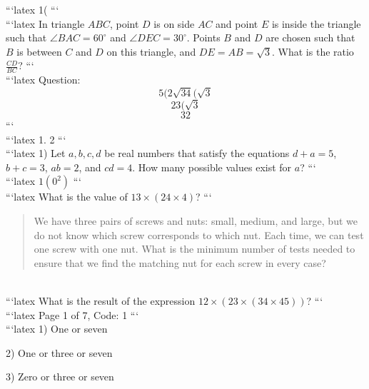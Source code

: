 ```latex
1(
```
\\
```latex
In triangle $ABC$, point $D$ is on side $AC$ and point $E$ is inside the triangle such that $\angle BAC = 60^\circ$ and $\angle DEC = 30^\circ$. Points $B$ and $D$ are chosen such that $B$ is between $C$ and $D$ on this triangle, and $DE = AB = \sqrt{3}$. What is the ratio $\frac{CD}{BC}$?
```
\\
```latex
Question:
\[ 5(2\sqrt{34}(\sqrt{3} \]
\[ 23(\sqrt{3} \]
\[ 32 \]
```
\\
```latex
1. 2
```
\\
```latex
1) Let \( a, b, c, d \) be real numbers that satisfy the equations \( d + a = 5 \), \( b + c = 3 \), \( ab = 2 \), and \( cd = 4 \). How many possible values exist for \( a \)?
```
\\
```latex
$1(0^2)$
```
\\
```latex
What is the value of $13 \times (24 \times 4)$?
```
\\
\begin{quote}
We have three pairs of screws and nuts: small, medium, and large, but we do not know which screw corresponds to which nut. Each time, we can test one screw with one nut. What is the minimum number of tests needed to ensure that we find the matching nut for each screw in every case?
\end{quote}
\\
```latex
What is the result of the expression $12 \times (23 \times (34 \times 45))$?
```
\\
```latex
Page 1 of 7, Code: 1
```
\\
```latex
1) One or seven

2) One or three or seven

3) Zero or three or seven


